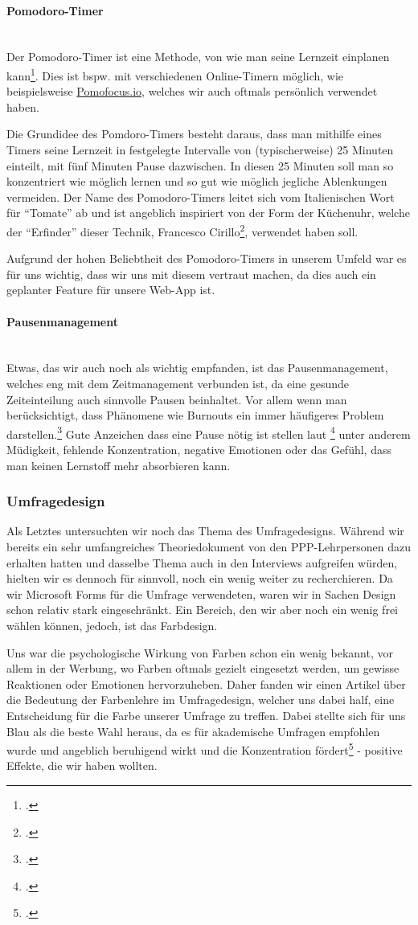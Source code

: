 \documentclass[12pt,a4paper]{report}
\newcommand{\myparagraph}[1]{\paragraph{#1}\mbox{}\\}
\begin{document}
\myparagraph{Pomodoro-Timer}
Der Pomodoro-Timer ist eine Methode, von wie man seine Lernzeit einplanen kann\footcite{Pomodoro}.
Dies ist bspw. mit verschiedenen Online-Timern möglich, wie beispielsweise \href{https://pomofocus.io/}{Pomofocus.io}, welches wir auch oftmals persönlich verwendet haben.

Die Grundidee des Pomdoro-Timers besteht daraus, dass man mithilfe eines Timers seine Lernzeit in festgelegte Intervalle von (typischerweise) 25 Minuten einteilt, mit fünf Minuten Pause dazwischen.
In diesen 25 Minuten soll man so konzentriert wie möglich lernen und so gut wie möglich jegliche Ablenkungen vermeiden. Der Name des Pomodoro-Timers leitet sich vom Italienischen Wort für \enquote{Tomate} ab und ist angeblich inspiriert von der Form der Küchenuhr, welche der \enquote{Erfinder} dieser Technik, Francesco Cirillo\footcite{Pomodoro}, verwendet haben soll.

Aufgrund der hohen Beliebtheit des Pomodoro-Timers in unserem Umfeld war es für uns wichtig, dass wir uns mit diesem vertraut machen, da dies auch ein geplanter Feature für unsere Web-App ist.

\myparagraph{Pausenmanagement}
Etwas, das wir auch noch als wichtig empfanden, ist das Pausenmanagement, welches eng mit dem Zeitmanagement verbunden ist, da eine gesunde Zeiteinteilung auch sinnvolle Pausen beinhaltet.
Vor allem wenn man berücksichtigt, dass Phänomene wie Burnouts ein immer häufigeres Problem darstellen.\footcite{Burnout}
Gute Anzeichen dass eine Pause nötig ist stellen laut \footcite{Pausenmanagement} unter anderem Müdigkeit, fehlende Konzentration, negative Emotionen oder das Gefühl, dass man keinen Lernstoff mehr absorbieren kann.

\subsubsection{Umfragedesign}
Als Letztes untersuchten wir noch das Thema des Umfragedesigns. 
Während wir bereits ein sehr umfangreiches Theoriedokument von den PPP-Lehrpersonen dazu erhalten hatten und dasselbe Thema auch in den Interviews aufgreifen würden, hielten wir es dennoch für sinnvoll, noch ein wenig weiter zu recherchieren.
Da wir Microsoft Forms für die Umfrage verwendeten, waren wir in Sachen Design schon relativ stark eingeschränkt. 
Ein Bereich, den wir aber noch ein wenig frei wählen können, jedoch, ist das Farbdesign.

Uns war die psychologische Wirkung von Farben schon ein wenig bekannt, vor allem in der Werbung, wo Farben oftmals gezielt eingesetzt werden, um gewisse Reaktionen oder Emotionen hervorzuheben.
Daher fanden wir einen Artikel über die Bedeutung der Farbenlehre im Umfragedesign, welcher uns dabei half, eine Entscheidung für die Farbe unserer Umfrage zu treffen.
Dabei stellte sich für uns Blau als die beste Wahl heraus, da es für akademische Umfragen empfohlen wurde und angeblich beruhigend wirkt und die Konzentration fördert\footcite{ColorPsychology} - positive Effekte, die wir haben wollten. 
\end{document}
